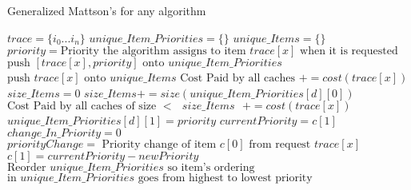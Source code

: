 
\begin{algorithm}
    \caption{Generalized Mattson's for any algorithm}\label{euclid}
        \begin{algorithmic}[1]
            \State $trace = \{i_0 ... i_n \}$
            \State $unique\_ Item\_ Priorities = \{\}$
            \State $unique\_ Items = \{\}$
                \State $priority = \text{Priority the algorithm assigns to item $trace[x]$ when it is requested}$
                    \State $\text{push } [trace[x],priority] \text{ onto }unique\_ Item\_ Priorities$
                     \State $\text{push } trace[x] \text{ onto }unique\_ Items$
                     \State $\text{Cost Paid by all caches } += cost(trace[x])$
                \Else 
                    \State $size\_Items = 0$
                        \State $size\_ Items+= size(unique\_Item\_ Priorities[d][0])$ 
                            \State $\text{Cost Paid by all caches of size $<$ $size\_ Items$ } += cost(trace[x])$
                            \State $unique\_Item\_ Priorities[d][1] = priority$             
                        \EndIf
                    \EndFor
                \EndIf
                    \State $currentPriority = c[1]$  
                    \State $change\_ In\_ Priority = 0$             
                        \State $priorityChange =\text{ Priority change of item $c[0]$ from request $trace[x]$}$
                    \EndIf
                    \State $c[1] = currentPriority - newPriority$
                \EndFor
                \State $\text{Reorder $unique\_ Item\_ Priorities$ so item's ordering}$
                \State$\text{in $unique\_ Item\_ Priorities$ goes from highest to lowest priority}$
            \EndFor
        \end{algorithmic}
\end{algorithm}



